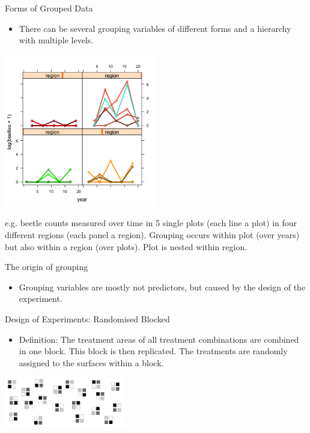 \documentclass{beamer}
\begin{document}
\begin{frame}{Forms of Grouped Data}
  \begin{itemize}
    \item There can be several grouping variables of different forms and a hierarchy with multiple levels. 
  \end{itemize}
  \begin{center}
    \includegraphics[width=0.5\textwidth]{lectures/day_1_intro_to_mems/figures/unnamed-chunk-40-1.png} %
  \end{center}
      e.g. beetle counts measured over time in 5 single plots (each line a plot) in four different regions (each panel a region). Grouping occurs within plot (over years) but also within a region (over plots). Plot is nested within region. 
\end{frame}

\begin{frame}{The origin of grouping}
  \begin{itemize}
    \item Grouping variables are mostly not predictors, but caused by the design of the experiment.
  \end{itemize}
\end{frame}

\begin{frame}{Design of Experiments: Randomised Blocked}
  \begin{itemize}
    \item Definition: The treatment areas of all treatment combinations are combined in one block. This block is then replicated. The treatments are randomly assigned to the surfaces within a block.
  \end{itemize}
  \begin{center}
    \includegraphics[width=0.4\textwidth]{lectures/day_1_intro_to_mems/figures/randomisedblockfig.png}
  \end{center}
\end{frame}
\end{document}
